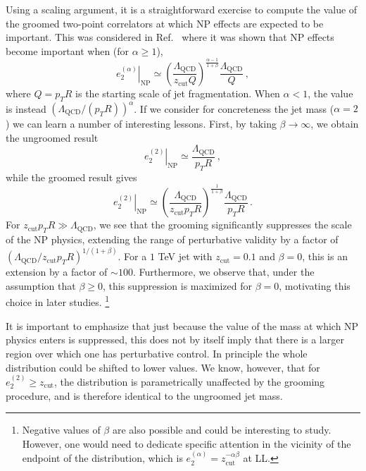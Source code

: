 \documentclass[11pt]{cernrep}
\begin{document}
Using a scaling argument, it is a straightforward exercise to compute the value of the groomed two-point correlators at which NP effects are expected to be important.
%
This was considered in Ref.~\cite{Frye:2016aiz,Dasgupta:2013ihk} where it was shown that NP effects become important when (for $\alpha \geq 1$),
%
\begin{equation}
\label{jetsub_alphas_eq:np}
\left. e_2^{(\alpha)}\right |_{\mathrm{NP}} \simeq  \left( \frac{\Lambda_{\mathrm{QCD}}}{z_{\mathrm{cut}}  Q}  \right)^{\frac{\alpha-1}{1+\beta}}  \frac{\Lambda_{\mathrm{QCD}}}{Q}\,,
\end{equation}
%
where $Q=p_TR$ is the starting scale of jet fragmentation.
%
When $\alpha< 1$, the value is instead $(\Lambda_{\mathrm{QCD}}/(p_TR))^\alpha$.
%
If we consider for concreteness the jet mass ($\alpha=2$) we can learn a number of interesting lessons.
%
First, by taking $\beta\to \infty$, we obtain the ungroomed result
%
\begin{equation}
\left. e_2^{(2)} \right |_{\mathrm{NP}} \simeq  \frac{\Lambda_{\mathrm{QCD}}}{p_TR}\,,
\end{equation} 
%
while the groomed result gives 
%
\begin{equation}
\left. e_2^{(2)} \right |_{\mathrm{NP}} \simeq  \left( \frac{\Lambda_{\mathrm{QCD}}}{z_{\mathrm{cut}}  p_TR}  \right)^{\frac{1}{1+\beta}}  \frac{\Lambda_{\mathrm{QCD}}}{p_TR}\,.
\end{equation}
%
For $z_{\mathrm{cut}}  p_T R \gg \Lambda_{\mathrm{QCD}}$, we see that the grooming significantly suppresses the scale of the NP physics, extending the range of perturbative validity by a factor of $({\Lambda_{\mathrm{QCD}}} / {z_{\mathrm{cut}}  p_TR})^{1/(1+\beta)}$.
%
For a $1$ TeV jet with $z_{\mathrm{cut}}  =0.1$ and $\beta=0$, this is an extension by a factor of $\sim 100$.
%
Furthermore, we observe that, under the assumption that $\beta \geq 0$, this suppression is maximized for $\beta=0$, motivating this choice in later studies.%
\footnote{Negative values of $\beta$ are also possible and could be interesting to study.  However, one would need to dedicate specific attention in the vicinity of the endpoint of the distribution, which is $e_2^{(\alpha)}=z_{\mathrm{cut}}^{-\alpha\beta}$ at LL.}

%
It is important to emphasize that just because the value of the mass at which NP physics enters is suppressed, this does not by itself imply that there is a larger region over which one has perturbative control.
%
In principle the whole distribution could be shifted to lower values.
%
We know, however, that for $e_2^{(2)}\geq z_{\mathrm{cut}} $, the distribution is parametrically unaffected by the grooming procedure, and is therefore identical to the ungroomed jet mass. 
\end{document}
